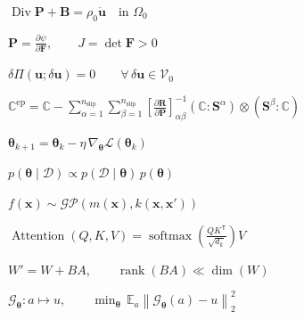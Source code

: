 \documentclass[12pt]{article}
\begin{document}
\begin{preview}
  \color{chalk}$\displaystyle
  \operatorname{Div}\bm{P}+\bm{B}=\rho_0\ddot{\bm{u}}
  \quad\text{in }\Omega_0$
\end{preview}

\begin{preview}
  \color{chalk}$\displaystyle
  \bm{P}=\frac{\partial\psi}{\partial\bm{F}},
  \qquad J=\det\bm{F}>0$
\end{preview}

\begin{preview}
  \color{chalk}$\displaystyle
  \delta\Pi(\bm{u};\delta\bm{u})=0
  \qquad\forall\,\delta\bm{u}\in\mathcal{V}_0$
\end{preview}

\begin{preview}
  \color{chalk}$\displaystyle
  \mathbb{C}^{\mathrm{ep}}
  =\mathbb{C}
  -\sum_{\alpha=1}^{n_{\mathrm{slip}}}
   \sum_{\beta=1}^{n_{\mathrm{slip}}}
  \left[\frac{\partial\bm{R}}{\partial\bm{P}}\right]^{-1}_{\!\alpha\beta}
  (\mathbb{C}:\bm{S}^{\alpha})\otimes(\bm{S}^{\beta}:\mathbb{C})$
\end{preview}

\begin{preview}
  \color{chalkgold}$\displaystyle
  \bm{\theta}_{k+1}=\bm{\theta}_k
  -\eta\,\nabla_{\!\bm{\theta}}\mathcal{L}(\bm{\theta}_k)$
\end{preview}

\begin{preview}
  \color{chalkblue}$\displaystyle
  p(\bm{\theta}\mid\mathcal{D})
  \propto p(\mathcal{D}\mid\bm{\theta})\,p(\bm{\theta})$
\end{preview}

\begin{preview}
  \color{chalkblue}$\displaystyle
  f(\bm{x})\sim\mathcal{GP}\!\left(m(\bm{x}),k(\bm{x},\bm{x}')\right)$
\end{preview}

\begin{preview}
  \color{chalk}$\displaystyle
  \operatorname{Attention}(Q,K,V)
  =\operatorname{softmax}\!\left(\frac{QK^{\mathsf T}}{\sqrt{d_k}}\right)V$
\end{preview}

\begin{preview}
  \color{chalk}$\displaystyle
  W'=W+BA,
  \qquad\operatorname{rank}(BA)\ll\dim(W)$
\end{preview}

\begin{preview}
  \color{chalk}$\displaystyle
  \mathcal{G}_{\bm{\theta}}:a\mapsto u,
  \qquad\min_{\bm{\theta}}\,\mathbb{E}_{a}
  \left\lVert\mathcal{G}_{\bm{\theta}}(a)-u\right\rVert_2^2$
\end{preview}
\end{document}
